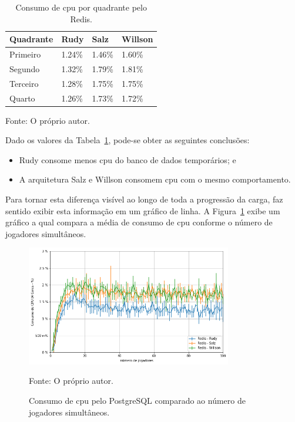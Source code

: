 \begin{table}[htb!]
\centering
\begin{adjustbox}{max width=\textwidth}
\caption{Consumo de \ac{cpu} por quadrante pelo Redis.}
\label{tab:cpu_redis_media_quadrantes}
\begin{tabular}{|l|l|l|l|}

\hline

Quadrante & Rudy    & Salz    & Willson \\ \hline

Primeiro  & 1.24\% & 1.46\% & 1.60\% \\ \hline

Segundo   & 1.32\% & 1.79\% & 1.81\% \\ \hline

Terceiro  & 1.28\% & 1.75\% & 1.75\% \\ \hline

Quarto    & 1.26\% & 1.73\% & 1.72\% \\ \hline

\end{tabular}

\end{adjustbox}

Fonte: O próprio autor.
\end{table}

Dado os valores da Tabela~\ref{tab:cpu_redis_media_quadrantes}, pode-se obter as seguintes conclusões:

\begin{itemize}
 \item Rudy consome menos \ac{cpu} do banco de dados temporários; e
 \item A arquitetura Salz e Willson consomem \ac{cpu} com o mesmo comportamento.
\end{itemize}

Para tornar esta diferença visível ao longo de toda a progressão da carga, faz sentido exibir esta informação em um gráfico de linha.
%
A Figura~\ref{fig:cpu_redis_media_por_jogador} exibe um gráfico a qual compara a média de consumo de \ac{cpu} conforme o número de jogadores simultâneos.

\begin{figure}[htb!]
  \caption{Consumo de \ac{cpu} pelo PostgreSQL comparado ao número de jogadores simultâneos.}
  \label{fig:cpu_redis_media_por_jogador}
  \includegraphics[width=0.8\textwidth]{figuras/analise/cpu_redis_media_por_jogador.png}
  \centering

  Fonte: O próprio autor.
\end{figure}

